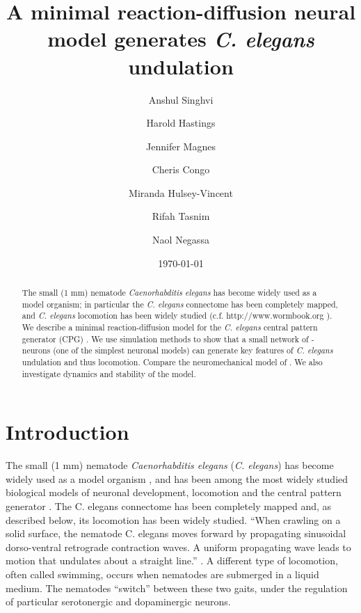 \documentclass[
    11pt,
    preprint,
    author-numerical,
    aps,
    prl, %
    natbib,
    superscriptaddress,
]{revtex4-2}
\begin{document}

\title{A minimal reaction-diffusion neural model generates {\emph{C. elegans}} undulation}
\author{Anshul Singhvi}
\author{Harold Hastings}
\author{Jennifer Magnes}
\author{Cheris Congo}
\author{Miranda Hulsey-Vincent}
\author{Rifah Tasnim}
\author{Naol Negassa}
\date{\today}
\begin{abstract}
    The small (1 mm) nematode \emph{Caenorhabditis elegans} has become widely used as a model organism; in particular the \emph{C. elegans} connectome has been completely mapped, and \emph{C. elegans} locomotion has been widely studied (c.f. http://www.wormbook.org \citep{corsi2015}). We describe a minimal reaction-diffusion model for the \emph{C. elegans} central pattern generator (CPG) \citep{xu2018,wen2012}. We use simulation methods to show that a small network of \cite{fitzhugh1955}-\cite{nagumo1962} neurons (one of the simplest neuronal models) can generate key features of \emph{C. elegans} undulation \citep[see][]{magnes2012} and thus locomotion. Compare the neuromechanical model of \cite{izquierdo2018}. We also investigate dynamics and stability of the model.
\end{abstract}

\maketitle

\section{Introduction}\label{sec: intro}

The small (1 mm) nematode \emph{Caenorhabditis elegans} (\emph{C. elegans}) has become widely used as a model organism \citep{corsi2015}, and has been among the most widely studied biological models of neuronal development, locomotion and the central pattern generator \citep{katz2016}.
The C. elegans connectome has been completely mapped \citep{jabr} and, as described below, its locomotion has been widely studied.
``When crawling on a solid surface, the nematode C. elegans moves forward by propagating sinusoidal dorso-ventral retrograde contraction waves. A uniform propagating wave leads to motion that undulates about a straight line.'' \citep{kim2011}.
A different type of locomotion, often called swimming, occurs when nematodes are submerged in a liquid medium. The nematodes “switch” between these two gaits, under the regulation of particular serotonergic and dopaminergic neurons.
\end{document}
